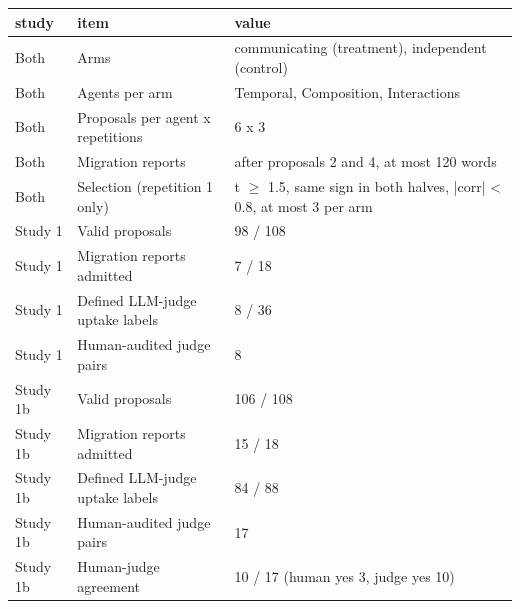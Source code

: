 \begin{tabular}{llp{3.3in}}
\toprule
study & item & value \\
\midrule
Both & Arms & communicating (treatment), independent (control) \\
Both & Agents per arm & Temporal, Composition, Interactions \\
Both & Proposals per agent x repetitions & 6 x 3 \\
Both & Migration reports & after proposals 2 and 4, at most 120 words \\
Both & Selection (repetition 1 only) & t $\geq$ 1.5, same sign in both halves, |corr| < 0.8, at most 3 per arm \\
Study 1 & Valid proposals & 98 / 108 \\
Study 1 & Migration reports admitted & 7 / 18 \\
Study 1 & Defined LLM-judge uptake labels & 8 / 36 \\
Study 1 & Human-audited judge pairs & 8 \\
Study 1b & Valid proposals & 106 / 108 \\
Study 1b & Migration reports admitted & 15 / 18 \\
Study 1b & Defined LLM-judge uptake labels & 84 / 88 \\
Study 1b & Human-audited judge pairs & 17 \\
Study 1b & Human-judge agreement & 10 / 17 (human yes 3, judge yes 10) \\
\bottomrule
\end{tabular}
